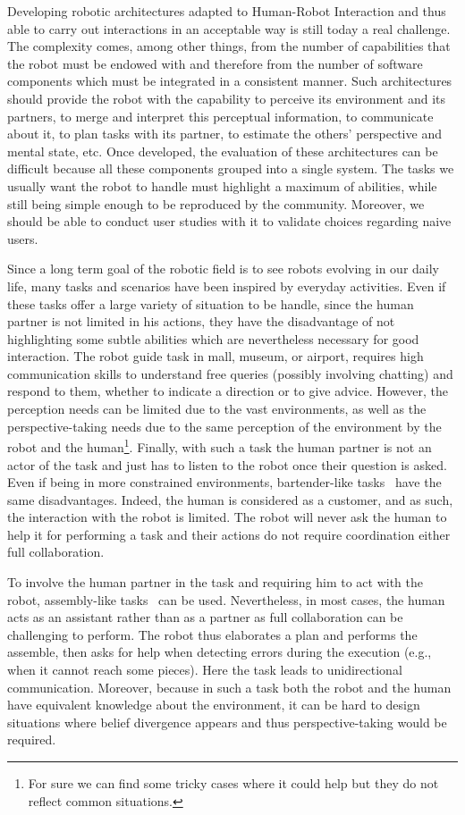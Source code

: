 Developing robotic architectures adapted to Human-Robot Interaction and thus able to carry out interactions in an acceptable way is still today a real challenge. The complexity comes, among other things, from the number of capabilities that the robot must be endowed with and therefore from the number of software components which must be integrated in a consistent manner. Such architectures should provide the robot with the capability to perceive its environment and its partners, to merge and interpret this perceptual information, to communicate about it, to plan tasks with its partner, to estimate the others' perspective and mental state, etc. Once developed, the evaluation of these architectures can be difficult because all these components grouped into a single system. The tasks we usually want the robot to handle must highlight a maximum of abilities, while still being simple enough to be reproduced by the community. Moreover, we should be able to conduct user studies with it to validate choices regarding naive users.

Since a long term goal of the robotic field is to see robots evolving in our daily life, many tasks and scenarios have been inspired by everyday activities. Even if these tasks offer a large variety of situation to be handle, since the human partner is not limited in his actions, they have the disadvantage of not highlighting some subtle abilities which are nevertheless necessary for good interaction.
The robot guide task \cite{satake_2015_should} in mall, museum, or airport, requires high communication skills to understand free queries (possibly involving chatting) and respond to them, whether to indicate a direction or to give advice. However, the perception needs can be limited due to the vast environments, as well as the perspective-taking needs due to the same perception of the environment by the robot and the human\footnote{For sure we can find some tricky cases where it could help but they do not reflect common situations.}. Finally, with such a task the human partner is not an actor of the task and just has to listen to the robot once their question is asked. Even if being in more constrained environments, bartender-like tasks~\cite{petrick_2012_social} have the same disadvantages. Indeed, the human is considered as a customer, and as such, the interaction with the robot is limited. The robot will never ask the human to help it for performing a task and their actions do not require coordination either full collaboration.

To involve the human partner in the task and requiring him to act with the robot, assembly-like tasks~\cite{tellex_2014_asking} can be used. Nevertheless, in most cases, the human acts as an assistant rather than as a partner as full collaboration can be challenging to perform. The robot thus elaborates a plan and performs the assemble, then asks for help when detecting errors during the execution (e.g., when it cannot reach some pieces). Here the task leads to unidirectional communication. Moreover, because in such a task both the robot and the human have equivalent knowledge about the environment, it can be hard to design situations where belief divergence appears and thus perspective-taking would be required.

